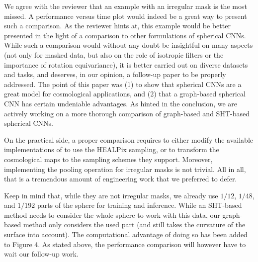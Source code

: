 \documentclass[12pt,a4paper]{article}
\newcommand{\nati}[1]{{\color[rgb]{.1,.6,.1}{NP: #1}}}
\newcommand{\1}{\b{1}}              %
\newcommand{\0}{\b{0}}              %
\begin{document}
We agree with the reviewer that an example with an irregular mask is the most missed.
A performance versus time plot would indeed be a great way to present such a comparison.
As the reviewer hints at, this example would be better presented in the light of a comparison to other formulations of spherical CNNs.
While such a comparison would without any doubt be insightful on many aspects (not only for masked data, but also on the role of isotropic filters or the importance of rotation equivariance), it is better carried out on diverse datasets and tasks, and deserves, in our opinion, a follow-up paper to be properly addressed.
The point of this paper was (1) to show that spherical CNNs are a great model for cosmological applications, and (2) that a graph-based spherical CNN has certain undeniable advantages.
As hinted in the conclusion, we are actively working on a more thorough comparison of graph-based and SHT-based spherical CNNs.

On the practical side, a proper comparison requires to either modify the available implementations of \cite{cohen2018sphericalcnn,esteves2017sphericalcnn,kondor2018clebsch} to use the HEALPix sampling, or to transform the cosmological maps to the sampling schemes they support.
Moreover, implementing the pooling operation for irregular masks is not trivial.
All in all, that is a tremendous amount of engineering work that we preferred to defer.

Keep in mind that, while they are not irregular masks, we already use $1/12$, $1/48$, and $1/192$ parts of the sphere for training and inference.
While an SHT-based method needs to consider the whole sphere to work with this data, our graph-based method only considers the used part (and still takes the curvature of the surface into account).
The computational advantage of doing so has been added to Figure 4.
As stated above, the performance comparison will however have to wait our follow-up work.


\end{document}
